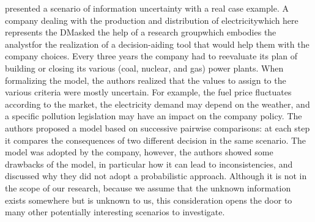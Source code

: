 \citet[Ch. 8]{Bouyssou2000} presented a scenario of information uncertainty with a real case example. A company dealing with the production and distribution of electricity\textemdash which here represents the \ac{DM}\textemdash asked the help of a research group\textemdash which embodies the analyst\textemdash for the realization of a decision-aiding tool that would help them with the company choices. Every three years the company had to reevaluate its plan of building or closing its various (coal, nuclear, and gas) power plants. When formalizing the model, the authors realized that the values to assign to the various criteria were mostly uncertain. For example, the fuel price fluctuates according to the market, the electricity demand may depend on the weather, and a specific pollution legislation may have an impact on the company policy. The authors proposed a model based on successive pairwise comparisons: at each step it compares the consequences of two different decision in the same scenario. The model was adopted by the company, however, the authors showed some drawbacks of the model, in particular how it can lead to inconsistencies, and discussed why they did not adopt a probabilistic approach. Although it is not in the scope of our research, because we assume that the unknown information exists somewhere but is unknown to us, this consideration opens the door to many other potentially interesting scenarios to investigate.

